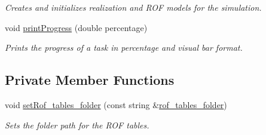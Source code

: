 \begin{DoxyCompactItemize}
$$\begin{DoxyCompactList}\small\item\em Creates and initializes realization and R\+OF models for the simulation. \end{DoxyCompactList}\item 
void \mbox{\hyperlink{classSimulation_a3279f9efae2c262b54ad4d16c631033c}{print\+Progress}} (double percentage)
\begin{DoxyCompactList}\small\item\em Prints the progress of a task in percentage and visual bar format. \end{DoxyCompactList}\end{DoxyCompactItemize}
\subsection*{Private Member Functions}
\begin{DoxyCompactItemize}
\item 
void \mbox{\hyperlink{classSimulation_a0f01e328435fab79c18ccdda28617bae}{set\+Rof\+\_\+tables\+\_\+folder}} (const string \&\mbox{\hyperlink{classSimulation_aca810eb7785417158d897dfdf366e9fa}{rof\+\_\+tables\+\_\+folder}})
\begin{DoxyCompactList}\small\item\em Sets the folder path for the R\+OF tables. \end{DoxyCompactList}\end{DoxyCompactItemize}
